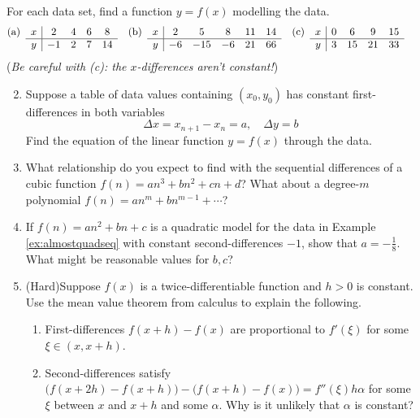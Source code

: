 \begin{exercises}{}{}
\exstart For each data set, find a function $y=f(x)$ modelling the data.
\begin{align*}
&\text{(a)}\lstsp\begin{array}[t]{c|ccccc}
		x&2&4&6&8\\\hline
		y&-1&2&7&14
		\end{array}
&&\text{(b)}\lstsp\begin{array}[t]{c|ccccc}
		x&2&5&8&11&14\\\hline
		y&-6&-15&-6&21&66
		\end{array}
&&\text{(c)}\lstsp\begin{array}[t]{c|ccccc}
		x&0&6&9&15\\\hline
		y&3&15&21&33
		\end{array}
\end{align*}
(\emph{Be careful with (c): the $x$-differences aren't constant!})

\begin{enumerate}\setcounter{enumi}{1}  
  \item Suppose a table of data values containing $(x_0,y_0)$ has constant first-differences in both variables
  \[\Delta x=x_{n+1}-x_n=a,\quad  \Delta y=b\]
  Find the equation of the linear function $y=f(x)$ through the data.
  

  \item What relationship do you expect to find with the sequential differences of a cubic function $f(n)=an^3+bn^2+cn+d$? What about a degree-$m$ polynomial $f(n)=an^m+bn^{m-1}+\cdots$?
  
  \item If $f(n)=an^2+bn+c$ is a quadratic model for the data in Example \ref{ex:almostquadseq} with constant second-differences $-1$, show that $a=-\frac 18$. What might be reasonable values for $b,c$?  
  
  \item (Hard)\lstsp Suppose $f(x)$ is a twice-differentiable function and $h>0$ is constant. Use the mean value theorem from calculus to explain the following.
  \begin{enumerate}
    \item First-differences $f(x+h)-f(x)$ are proportional to $f'(\xi)$ for some $\xi\in (x,x+h)$.
    \item Second-differences satisfy $\bigl(f(x+2h)-f(x+h)\bigr)-\bigl(f(x+h)-f(x)\bigr)=f''(\xi)h\alpha$ for some $\xi$ between $x$ and $x+h$ and some $\alpha$. Why is it unlikely that $\alpha$ is constant?
  \end{enumerate}
\end{enumerate}
\end{exercises}



